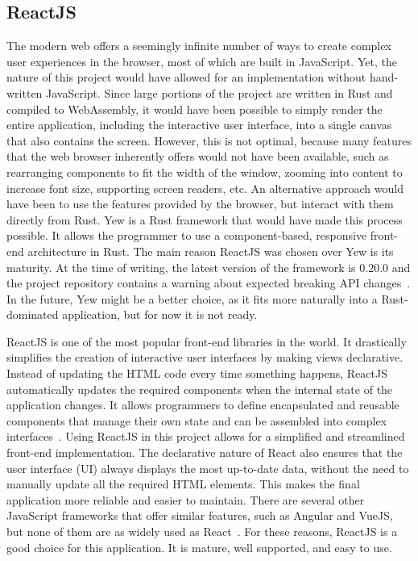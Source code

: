 \subsection{ReactJS} \label{react-js}
The modern web offers a seemingly infinite number of ways to create complex user experiences in the browser, most of which are built in JavaScript.
Yet, the nature of this project would have allowed for an implementation without hand-written JavaScript.
Since large portions of the project are written in Rust and compiled to WebAssembly, it would have been possible to simply render the entire application, including the interactive user interface, into a single canvas that also contains the screen.
However, this is not optimal, because many features that the web browser inherently offers would not have been available, such as rearranging components to fit the width of the window, zooming into content to increase font size, supporting screen readers, etc.
An alternative approach would have been to use the features provided by the browser, but interact with them directly from Rust.
Yew is a Rust framework that would have made this process possible. It allows the programmer to use a component-based, responsive front-end architecture in Rust.
The main reason ReactJS was chosen over Yew is its maturity. At the time of writing, the latest version of the framework is 0.20.0 and the project repository contains a warning about expected breaking API changes~\cite{yewweb}.
In the future, Yew might be a better choice, as it fits more naturally into a Rust-dominated application, but for now it is not ready.

ReactJS is one of the most popular front-end libraries in the world. It drastically simplifies the creation of interactive user interfaces by making views declarative.
Instead of updating the HTML code every time something happens, ReactJS automatically updates the required components when the internal state of the application changes.
It allows programmers to define encapsulated and reusable components that manage their own state and can be assembled into complex interfaces~\cite{reactweb}.
Using ReactJS in this project allows for a simplified and streamlined front-end implementation.
The declarative nature of React also ensures that the user interface (UI) always displays the most up-to-date data, without the need to manually update all the required HTML elements. This makes the final application more reliable and easier to maintain.
There are several other JavaScript frameworks that offer similar features, such as Angular and VueJS, but none of them are as widely used as React~\cite{webframework}.
For these reasons, ReactJS is a good choice for this application. It is mature, well supported, and easy to use.


